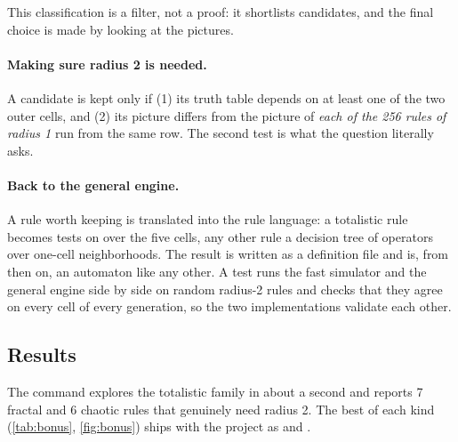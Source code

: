 This classification is a filter, not a proof: it shortlists candidates, and the final choice is
made by looking at the pictures.

\paragraph{Making sure radius 2 is needed.} A candidate is kept only if (1) its truth table
depends on at least one of the two outer cells, and (2) its picture differs from the picture of
\emph{each of the 256 rules of radius 1} run from the same row. The second test is what the
question literally asks.

\paragraph{Back to the general engine.} A rule worth keeping is translated into the rule
language: a totalistic rule becomes tests on  over the five cells, any other rule a
decision tree of  operators over one-cell neighborhoods. The result is written as a
definition file and is, from then on, an automaton like any other. A test runs the fast simulator
and the general engine side by side on random radius-2 rules and checks that they agree on every
cell of every generation, so the two implementations validate each other.

\subsection{Results}

The command  explores the totalistic family in about a
second and reports 7 fractal and 6 chaotic rules that genuinely need radius 2. The best of each
kind (\cref{tab:bonus}, \cref{fig:bonus}) ships with the project as
 and .

